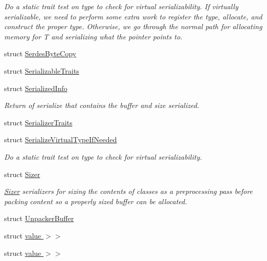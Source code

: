 \begin{DoxyCompactItemize}
\begin{DoxyCompactList}\small\item\em Do a static trait test on type to check for virtual serializability. If virtually serializable, we need to perform some extra work to register the type, allocate, and construct the proper type. Otherwise, we go through the normal path for allocating memory for T and serializing what the pointer points to. \end{DoxyCompactList}\item 
struct \hyperlink{structcheckpoint_1_1_serdes_byte_copy}{Serdes\+Byte\+Copy}
\item 
struct \hyperlink{structcheckpoint_1_1_serializable_traits}{Serializable\+Traits}
\item 
struct \hyperlink{structcheckpoint_1_1_serialized_info}{Serialized\+Info}
\begin{DoxyCompactList}\small\item\em Return of serialize that contains the buffer and size serialized. \end{DoxyCompactList}\item 
struct \hyperlink{structcheckpoint_1_1_serializer_traits}{Serializer\+Traits}
\item 
struct \hyperlink{structcheckpoint_1_1_serialize_virtual_type_if_needed}{Serialize\+Virtual\+Type\+If\+Needed}
\begin{DoxyCompactList}\small\item\em Do a static trait test on type to check for virtual serializability. \end{DoxyCompactList}\item 
struct \hyperlink{structcheckpoint_1_1_sizer}{Sizer}
\begin{DoxyCompactList}\small\item\em \hyperlink{structcheckpoint_1_1_sizer}{Sizer} serializers for sizing the contents of classes as a preprocessing pass before packing content so a properly sized buffer can be allocated. \end{DoxyCompactList}\item 
struct \hyperlink{structcheckpoint_1_1_unpacker_buffer}{Unpacker\+Buffer}
\item 
struct \hyperlink{structcheckpoint_1_1_reconstruct_as_virtual_if_needed_3_01_t_00_01_serializer_t_00_01typename_01bd353309780a1641c6b4da6107e9b732}{value $>$$>$}
\item 
struct \hyperlink{structcheckpoint_1_1_reconstruct_as_virtual_if_needed_3_01_t_00_01_serializer_t_00_01typename_0185cb3961b0806c240679cf17dd651016}{value $>$$>$}
\end{DoxyCompactItemize}
